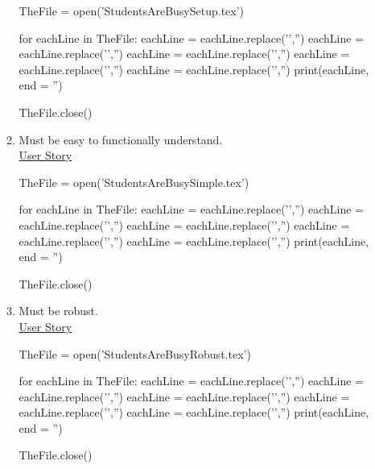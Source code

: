 \begin{itemize}
\begin{enumerate}
\begin{python}
TheFile = open('StudentsAreBusySetup.tex')

for eachLine in TheFile:
    eachLine = eachLine.replace('','')
    eachLine = eachLine.replace('','')
    eachLine = eachLine.replace('','')
    eachLine = eachLine.replace('','')
    eachLine = eachLine.replace('','')
    print(eachLine, end = '')
		
TheFile.close()
\end{python}
\bigskip
	
		\item Must be easy to functionally understand.\\[.5cm] \underline{User Story}\\

\begin{python}
TheFile = open('StudentsAreBusySimple.tex')

for eachLine in TheFile:
    eachLine = eachLine.replace('','')
    eachLine = eachLine.replace('','')
    eachLine = eachLine.replace('','')
    eachLine = eachLine.replace('','')
    eachLine = eachLine.replace('','')
    print(eachLine, end = '')
		
TheFile.close()
\end{python}
\bigskip
		
		\item Must be robust.\\[.5cm] \underline{User Story}\\
		
\begin{python}
TheFile = open('StudentsAreBusyRobust.tex')

for eachLine in TheFile:
    eachLine = eachLine.replace('','')
    eachLine = eachLine.replace('','')
    eachLine = eachLine.replace('','')
    eachLine = eachLine.replace('','')
    eachLine = eachLine.replace('','')
    print(eachLine, end = '')
		
TheFile.close()
\end{python}
\bigskip
		

\end{enumerate}
\end{itemize}
